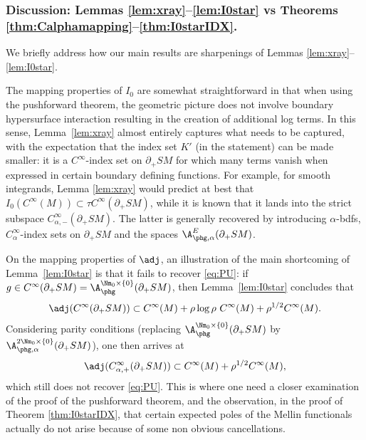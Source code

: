 \subsubsection*{Discussion: Lemmas \ref{lem:xray}--\ref{lem:I0star} vs Theorems \ref{thm:Calphamapping}--\ref{thm:I0starIDX}.}

We briefly address how our main results are sharpenings of Lemmas \ref{lem:xray}--\ref{lem:I0star}.

The mapping properties of $I_0$ are somewhat straightforward in that when using the pushforward theorem, the geometric picture does not involve boundary hypersurface interaction resulting in the creation of additional log terms. In this sense, Lemma~\ref{lem:xray} almost entirely captures what needs to be captured, with the expectation that the index set $K'$ (in the statement) can be made smaller: it is a $C^\infty$-index set on $\partial_+ SM$ for which many terms vanish when expressed in certain boundary defining functions. For example, for smooth integrands, Lemma \ref{lem:xray} would predict at best that $I_0 (C^\infty(M))\subset \tau C^\infty(\partial_+ SM)$, while it is known that it lands into the strict subspace $C_{\alpha,-}^\infty(\partial_+ SM)$. The latter is generally recovered by introducing $\alpha$-bdfs, $C_\alpha^\infty$-index sets on $\partial_+ SM$ and the spaces $\A_{\phg,\alpha}^E (\partial_+ SM)$.

On the mapping properties of $\adj$, an illustration of the main shortcoming of Lemma~\ref{lem:I0star} is that it fails to recover \eqref{eq:PU}: if $g\in C^\infty(\partial_+ SM) = \A^{\Nm_0\times \{0\}}_{\phg}(\partial_+ SM)$, then Lemma~\ref{lem:I0star} concludes that
\begin{equation*}
\adj (C^\infty(\partial_+ SM)) \subset C^\infty(M) + \rho\log \rho\ C^\infty(M) + \rho^{1/2} C^\infty(M).
\end{equation*}
Considering parity conditions (\eg replacing $\A^{\Nm_0\times \{0\}}_{\phg}(\partial_+ SM)$ by $\A^{2\Nm_0\times \{0\}}_{\phg,\alpha}(\partial_+ SM)$), one then arrives at
\begin{equation*}
\adj (C_{\alpha,+}^\infty(\partial_+ SM)) \subset C^\infty(M) + \rho^{1/2} C^\infty(M),
\end{equation*}
which still does not recover \eqref{eq:PU}. This is where one need a closer examination of the proof of the pushforward theorem, and the observation, in the proof of Theorem \ref{thm:I0starIDX}, that certain expected poles of the Mellin functionals actually do not arise because of some non obvious cancellations.

